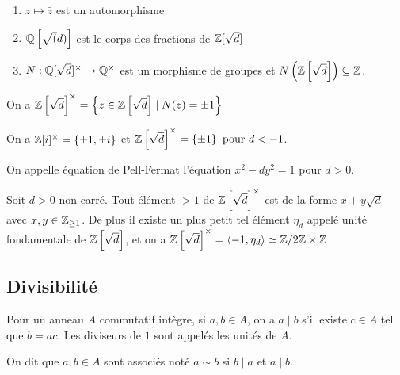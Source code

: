 \documentclass{cours}
\begin{document}
\begin{lemma}
    \begin{enumerate}
        \item $z \mapsto \bar{z}$ est un automorphisme
        \item $\mathbb{Q}\left[\sqrt(d)\right]$ est le corps des fractions de $\mathbb{Z}[\sqrt{d}]$
        \item $N : \mathbb{Q}[\sqrt{d}]^{\times} \mapsto \mathbb{Q}^{\times}$ est un morphisme de groupes et $N\left(\mathbb{Z}\left[\sqrt{d}\right]\right) \subseteq \mathbb{Z}$.
    \end{enumerate}
\end{lemma}

\begin{lemma}
    On a $ \mathbb{Z}\left[\sqrt{d}\right]^{\times} = \left\{z \in \mathbb{Z}\left[\sqrt{d}\right] \mid N(z) = \pm 1\right\}$
\end{lemma}

\begin{corollary}
    On a $\mathbb{Z}[i]^{\times} = \left\{\pm 1, \pm i\right\}$ et $\mathbb{Z}\left[\sqrt{d}\right]^{\times} = \left\{\pm 1\right\} \text{ pour } d < -1$.
\end{corollary}

\begin{remark}
    On appelle équation de Pell-Fermat l'équation $x^{2} - dy^{2} = 1$ pour $d > 0$.
\end{remark}

\begin{proposition}
    Soit $d > 0$ non carré. Tout élément $> 1$ de $\mathbb{Z}\left[\sqrt{d}\right]^{\times}$ est de la forme $x + y\sqrt{d}$ avec $x, y \in \mathbb{Z}_{\geq 1}$. De plus il existe un plus petit tel élément $\eta_{d}$ appelé unité fondamentale de $\mathbb{Z}\left[\sqrt{d}\right]$, et on a $\mathbb{Z}\left[\sqrt{d}\right]^{\times} = \left\langle -1, \eta_{d} \right\rangle \simeq \mathbb{Z}/2\mathbb{Z} \times \mathbb{Z}$
\end{proposition}

\subsection{Divisibilité}
\begin{definition}
    Pour un anneau $A$ commutatif intègre, si $a, b \in A$, on a $a\mid b$ s'il existe $c\in A$ tel que $b = ac$. Les diviseurs de $1$ sont appelés les unités de $A$.
\end{definition}

\begin{definition}
    On dit que $a, b \in A$ sont associés noté $a \sim b$ si $b \mid a$ et $a \mid b$.
\end{definition}
\end{document}
